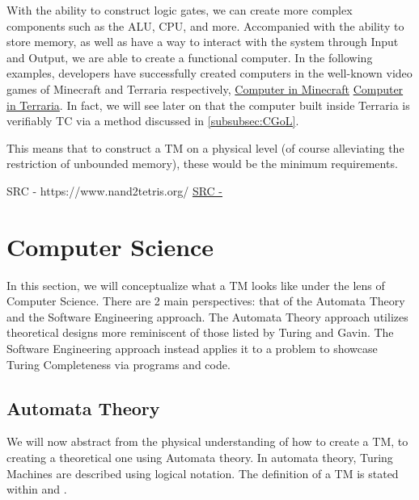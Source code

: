 With the ability to construct logic gates, we can create more complex components such as the ALU, CPU, and more.
Accompanied with the ability to store memory, as well as have a way to interact with the system through Input and Output, we are able to create a functional computer.
In the following examples, developers have successfully created computers in the well-known video games of Minecraft and Terraria respectively,
\href{https://www.youtube.com/watch?v=CW9N6kGbu2I}{Computer in Minecraft}
\href{https://www.youtube.com/watch?v=zXPiqk0-zDY}{Computer in Terraria}.
In fact, we will see later on that the computer built inside Terraria is verifiably TC via a method discussed in \ref{subsubsec:CGoL}.

This means that to construct a TM on a physical level (of course alleviating the restriction of unbounded memory), these would be the minimum requirements.

SRC - https://www.nand2tetris.org/
\href{https://www.amazon.com/Elements-Computing-Systems-Building-Principles/dp/0262640686/ref=ed_oe_p}{SRC - }

\section{Computer Science}\label{sec:CompSci}

In this section, we will conceptualize what a TM looks like under the lens of Computer Science.
There are 2 main perspectives: that of the Automata Theory and the Software Engineering approach.
The Automata Theory approach utilizes theoretical designs more reminiscent of those listed by Turing and Gavin.
The Software Engineering approach instead applies it to a problem to showcase Turing Completeness via programs and code.

\subsection{Automata Theory}\label{subsec:AutomataThy}

We will now abstract from the physical understanding of how to create a TM, to creating a theoretical one using Automata theory.
In automata theory, Turing Machines are described using logical notation.
The definition of a TM is stated within \cite{IntroFormLangAuto} and \cite{TuBB}.

